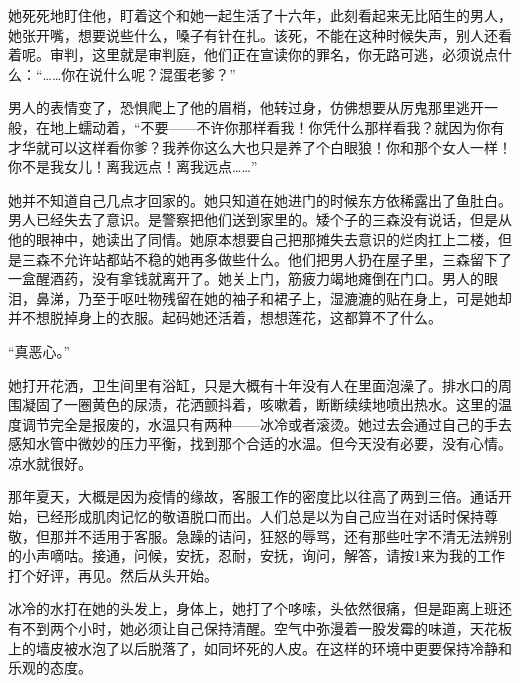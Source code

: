 \documentclass{article}
\begin{document}
她死死地盯住他，盯着这个和她一起生活了十六年，此刻看起来无比陌生的男人，她张开嘴，想要说些什么，嗓子有针在扎。该死，不能在这种时候失声，别人还看着呢。审判，这里就是审判庭，他们正在宣读你的罪名，你无路可逃，必须说点什么：“……你在说什么呢？混蛋老爹？”



男人的表情变了，恐惧爬上了他的眉梢，他转过身，仿佛想要从厉鬼那里逃开一般，在地上蠕动着，“不要——不许你那样看我！你凭什么那样看我？就因为你有才华就可以这样看你爹？我养你这么大也只是养了个白眼狼！你和那个女人一样！你不是我女儿！离我远点！离我远点……”



\newpage



她并不知道自己几点才回家的。她只知道在她进门的时候东方依稀露出了鱼肚白。男人已经失去了意识。是警察把他们送到家里的。矮个子的三森没有说话，但是从他的眼神中，她读出了同情。她原本想要自己把那摊失去意识的烂肉扛上二楼，但是三森不允许站都站不稳的她再多做些什么。他们把男人扔在屋子里，三森留下了一盒醒酒药，没有拿钱就离开了。她关上门，筋疲力竭地瘫倒在门口。男人的眼泪，鼻涕，乃至于呕吐物残留在她的袖子和裙子上，湿漉漉的贴在身上，可是她却并不想脱掉身上的衣服。起码她还活着，想想莲花，这都算不了什么。



“真恶心。”



\newpage



她打开花洒，卫生间里有浴缸，只是大概有十年没有人在里面泡澡了。排水口的周围凝固了一圈黄色的尿渍，花洒颤抖着，咳嗽着，断断续续地喷出热水。这里的温度调节完全是报废的，水温只有两种——冰冷或者滚烫。她过去会通过自己的手去感知水管中微妙的压力平衡，找到那个合适的水温。但今天没有必要，没有心情。凉水就很好。



那年夏天，大概是因为疫情的缘故，客服工作的密度比以往高了两到三倍。通话开始，已经形成肌肉记忆的敬语脱口而出。人们总是以为自己应当在对话时保持尊敬，但那并不适用于客服。急躁的诘问，狂怒的辱骂，还有那些吐字不清无法辨别的小声嘀咕。接通，问候，安抚，忍耐，安抚，询问，解答，请按1来为我的工作打个好评，再见。然后从头开始。



冰冷的水打在她的头发上，身体上，她打了个哆嗦，头依然很痛，但是距离上班还有不到两个小时，她必须让自己保持清醒。空气中弥漫着一股发霉的味道，天花板上的墙皮被水泡了以后脱落了，如同坏死的人皮。在这样的环境中更要保持冷静和乐观的态度。
\end{document}
